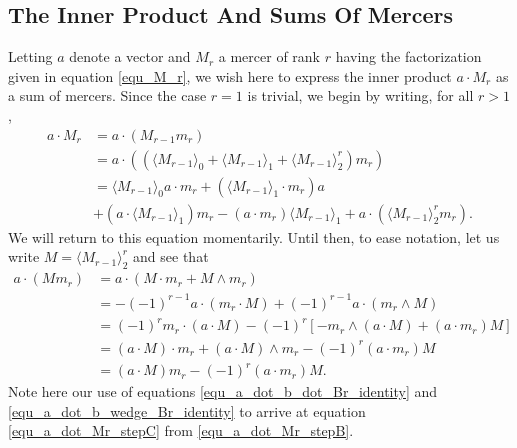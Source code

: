 \documentclass{birkjour}
\theoremstyle{definition}
\theoremstyle{remark}
\numberwithin{equation}{section}
\begin{document}

\subsection{The Inner Product And Sums Of Mercers}

Letting $a$ denote a vector and $M_r$ a mercer of rank $r$ having the factorization
given in equation \eqref{equ_M_r},
we wish here to express the inner product $a\cdot M_r$ as a sum of mercers.
Since the case $r=1$ is trivial, we begin by writing, for all $r>1$,
\begin{align}
a\cdot M_r &= a\cdot (M_{r-1}m_r)\nonumber \\
 &= a\cdot((\langle M_{r-1}\rangle_0 + \langle M_{r-1}\rangle_1 + \langle M_{r-1}\rangle_2^r)m_r)\nonumber \\
 &= \langle M_{r-1}\rangle_0a\cdot m_r + (\langle M_{r-1}\rangle_1\cdot m_r)a\nonumber \\
 &+ (a\cdot\langle M_{r-1}\rangle_1)m_r - (a\cdot m_r)\langle M_{r-1}\rangle_1 + a\cdot(\langle M_{r-1}\rangle_2^rm_r).\label{equ_a_dot_Mr_stepA}
\end{align}
We will return to this equation momentarily.  Until then, to ease notation, let us write $M=\langle M_{r-1}\rangle_2^r$ and see that
\begin{align}
a\cdot(Mm_r)
 &= a\cdot(M\cdot m_r + M\wedge m_r)\nonumber \\
 &= -(-1)^{r-1}a\cdot(m_r\cdot M) + (-1)^{r-1}a\cdot(m_r\wedge M)\label{equ_a_dot_Mr_stepB} \\
 &= (-1)^rm_r\cdot(a\cdot M) - (-1)^r\left[-m_r\wedge(a\cdot M)+(a\cdot m_r)M\right]\label{equ_a_dot_Mr_stepC} \\
 &= (a\cdot M)\cdot m_r + (a\cdot M)\wedge m_r - (-1)^r(a\cdot m_r)M\nonumber \\
 &= (a\cdot M)m_r - (-1)^r(a\cdot m_r)M.\label{equ_a_dot_Mr_stepD}
\end{align}
Note here our use of equations \eqref{equ_a_dot_b_dot_Br_identity} and \eqref{equ_a_dot_b_wedge_Br_identity} to
arrive at equation \eqref{equ_a_dot_Mr_stepC} from \eqref{equ_a_dot_Mr_stepB}.
\end{document}
